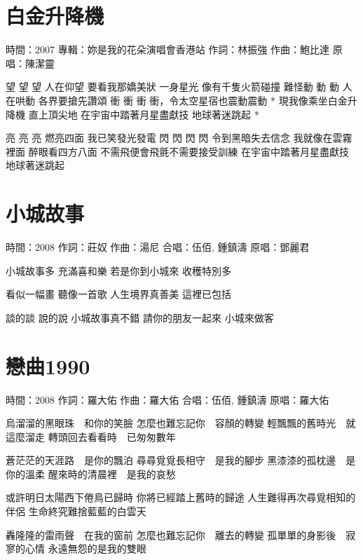 \documentclass[UTF8,a4paper,oneside,twocolumn,12pt]{ctexbook}
\newcommand{\infopair}[2]{\textbullet #1：#2}
\newcommand{\zc}[1][伍佰]{\infopair{作詞}{#1}}
\newcommand{\zq}[1][伍佰]{\infopair{作曲}{#1}}
\newcommand{\zj}[1]{\infopair{專輯}{#1}}
\newcommand{\yc}[1]{\infopair{原唱}{#1}}
\newcommand{\sj}[1]{\infopair{時間}{#1}}
\newenvironment{info}{\begin{flushleft}\kaishu
	}
	{\end{flushleft}\normalsize\yahei\par}
\newenvironment{lyric}{
	}
{}
\begin{document}
\section{白金升降機} %
\begin{info}
	\sj{2007}
	\zj{妳是我的花朵演唱會香港站}
	\zc[林振強]
	\zq[鮑比達]
	\yc{陳潔靈}
\end{info}
\begin{lyric}
	望 望 望 人在仰望 要看我那嬌美狀
	一身星光 像有千隻火箭碰撞
	難怪動 動 動 人在哄動 各界要搶先讚頌
	衝 衝 衝 衝，令太空星宿也震動震動
	* 現我像乘坐白金升降機 直上頂尖地
	在宇宙中踏著月星盡獻技 地球著迷跳起 *

	亮 亮 亮 燃亮四面 我已笑發光發電
	閃 閃 閃 閃 令到黑暗失去信念
	我就像在雲霧裡面 醉眼看四方八面
	不需飛便會飛氈不需要接受訓練
	在宇宙中踏著月星盡獻技 地球著迷跳起
\end{lyric}

\section{小城故事}
\begin{info}
	\sj{2008}
	\zc[莊奴]
	\zq[湯尼]
	\infopair{合唱}{伍佰, 鍾鎮濤}
	\yc{鄧麗君}
\end{info}
\begin{lyric}
	小城故事多
	充滿喜和樂
	若是你到小城來
	收穫特別多

	看似一幅畫
	聽像一首歌
	人生境界真善美
	這裡已包括

	談的談 說的說
	小城故事真不錯
	請你的朋友一起來
	小城來做客
\end{lyric}

\section{戀曲1990}
\begin{info}
	\sj{2008}
	\zc[羅大佑]
	\zq[羅大佑]
	\infopair{合唱}{伍佰, 鍾鎮濤}
	\yc{羅大佑}
\end{info}
\begin{lyric}
	烏溜溜的黑眼珠　和你的笑臉
	怎麼也難忘記你　容顏的轉變
	輕飄飄的舊時光　就這麼溜走
	轉頭回去看看時　已匆匆數年

	蒼茫茫的天涯路　是你的飄泊
	尋尋覓覓長相守　是我的腳步
	黑漆漆的孤枕邊　是你的溫柔
	醒來時的清晨裡　是我的哀愁

	或許明日太陽西下倦鳥已歸時
	你將已經踏上舊時的歸途
	人生難得再次尋覓相知的伴侶
	生命終究難捨藍藍的白雲天

	轟隆隆的雷雨聲　在我的窗前
	怎麼也難忘記你　離去的轉變
	孤單單的身影後　寂寥的心情
	永遠無怨的是我的雙眼
\end{lyric}
\end{document}

